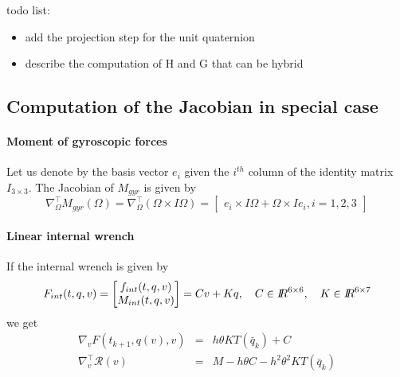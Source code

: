 \begin{ndrva}

  todo list:
  
  \begin{itemize}


  \item add the projection step for the unit quaternion

  \item describe the computation of H and G that can be hybrid

    
\end{itemize}

\end{ndrva}


\subsection{Computation of the Jacobian in special case}

\paragraph{Moment of gyroscopic forces}
Let us denote by the basis vector $e_i$ given the $i^{th}$ column of the identity matrix $I_{3\times3}$. The Jacobian of $M_{gyr}$ is given by
\begin{equation}
  \label{eq:112}
  \nabla^\top_\Omega M_{gyr}(\Omega) = \nabla^\top_\Omega (\Omega \times I \Omega) =
  \begin{bmatrix}
    e_i \times I \Omega + \Omega \times I e_i, i =1,2,3
  \end{bmatrix}
\end{equation}

\paragraph{Linear internal wrench}
If the internal wrench  is given by
\begin{equation}
  \label{eq:113}
  F_{int}(t,q,v) =
  \begin{bmatrix}
    f_{int}(t,q,v)\\
    M_{int}(t,q,v)
  \end{bmatrix}
  = C v + K q, \quad C \in \mbox{\rm $I\!\!R$}^{6\times 6}, \quad K \in \mbox{\rm $I\!\!R$}^{6\times 7 }
\end{equation}
we get
\begin{equation}
  \label{eq:114}
  \begin{array}{lcl}
    \nabla_v F(t_{k+1}, q(v),v)  &=& h \theta K T(\bar q_k) + C \\
    \nabla^\top_v \mathcal R(v) &=& M - h \theta C - h^2 \theta^2 K T(\bar q_k)
  \end{array}
\end{equation}

